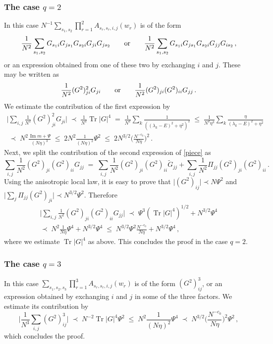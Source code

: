\documentclass[11pt]{article} %
\numberwithin{equation}{section}
\numberwithin{figure}{section}
\theoremstyle{plain} %
\theoremstyle{definition} %
\newcommand{\wt}{\widetilde}
\newcommand{\txt}[1]{\text{\rm{#1}}}
\renewcommand{\leq}{\leqslant}
\newcommand{\p}[1]{({#1})}
\newcommand{\pbb}[1]{\biggl({#1}\biggr)}
\newcommand{\abs}[1]{\lvert #1 \rvert}
\newcommand{\absb}[1]{\bigl\lvert #1 \bigr\rvert}
\newcommand{\absbb}[1]{\biggl\lvert #1 \biggr\rvert}
\DeclareMathOperator{\tr}{Tr}
\DeclareMathOperator{\im}{Im}
\begin{document}
\subsubsection*{The case $q = 2$}
In this case $N^{-1} \sum_{s_1, s_2} \prod_{r = 1}^2 A_{s_r,s_r,i,j }(w_r)$ is of the form
\begin{equation}
\frac{1}{N^2} \sum_{s_1, s_2} G_{s_1 i} G_{j s_1} G_{s_2 i} G_{ji} G_{j s_2} \qquad \txt{or} \qquad \frac{1}{N^2} \sum_{s_1, s_2} G_{s_1 i} G_{j s_1} G_{s_2 i} G_{jj} G_{i s_2}\,,
\end{equation}
or an expression obtained from one of these two by exchanging $i$ and $j$. These may be written as
\begin{equation} \label{piece}
\frac{1}{N^2} (G^2)_{ji}^2 G_{ji} \qquad \txt{or} \qquad  \frac{1}{N^2} (G^2)_{ji} (G^2)_{ii} G_{jj}\,.
\end{equation}
We estimate the contribution of the first expression by
\begin{multline*}
\absbb{\sum_{i,j}  \frac{1}{N^2} (G^2)_{ji}^2 G_{ji}} \;\prec\; \frac{1}{N^2} \tr|G|^4 \;=\; \frac{1}{N^2} \sum_k \frac{1}{\p{(\lambda_k - E)^2 + \eta^2}^2} \;\leq\; \frac{1}{N^2 \eta^3} \sum_k \frac{\eta}{(\lambda_k - E)^2 + \eta^2}
\\
\;\prec\; N^2 \frac{\im m + \Psi}{(N\eta)^3} \;\leq\; 2 N^2 \frac{1}{(N \eta)^2} \Psi^2 \;\leq\; 2 N^{3/2} \pbb{\frac{N^{-c_0}}{N \eta}}^2\,.
\end{multline*}
Next, we split the contribution of the second expression of \eqref{piece} as
  $$
 \sum_{i,j}  \frac{1}{N^2} (G^2)_{ji}   (G^2)_{ii}  G_{jj} \;=\;
  \sum_{i,j}   \frac{1}{N^2} (G^2)_{ji}   (G^2)_{ii}  \wt G_{jj}+  
  \sum_{i,j}   \frac{1}{N^2} \Pi_{jj}(G^2)_{ji}   (G^2)_{ii}\,.
  $$
Using the anisotropic local law, it is easy to prove that $\abs{(G^2)_{ij}} \prec N\Psi^2$ and $\absb{\sum_j \Pi_{jj} (G^2)_{ji}} \prec N^{3/2}\Psi^2$. Therefore 
\begin{multline*}
\absbb{\sum_{i,j}  \frac{1}{N^2} (G^2)_{ji}   (G^2)_{ii}  G_{jj}}
\;\prec\; \Psi^3(\tr|G|^4)^{1/2}+ N^{3/2}\Psi^4
\\
\prec\; N^2\frac{1}{N \eta}\Psi^4+ N^{3/2}\Psi^4 \;\leq\; N^{3/2} \Psi^2 \frac{N^{- c_0}}{N \eta} + N^{3/2} \Psi^4\,,
\end{multline*}
where we estimate $\tr \abs{G}^4$ as above. This concludes the proof in the case $q = 2$.

       
\subsubsection*{The case $q = 3$}
In this case $\sum_{s_1, s_2, s_3} \prod_{r = 1}^3 A_{s_r, s_r,i,j }(w_r)$ is of the form $(G^2)_{ij}^3$, or an expression obtained by exchanging $i$ and $j$ in some of the three factors. We estimate its contribution by
 $$
\absbb{\frac{1}{N^3} \sum_{i,j} (G^2)_{ij}^3} \;\prec\; N^{-2}\tr |G|^4\Psi^2
\;\leq\; N^2 \frac{1}{(N\eta)^2} \Psi^4 \;\prec\; N^{3/2} \pbb{\frac{N^{-c_0}}{N \eta}}^2 \Psi^2\,,
 $$
 which concludes the proof.
  
\end{document}
